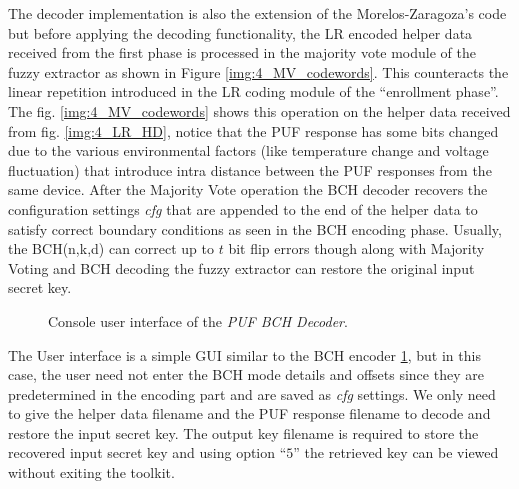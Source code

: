 	The decoder implementation is also the extension of the Morelos-Zaragoza's code \cite{69} but before applying the decoding functionality, the LR encoded helper data received from the first phase is processed in the majority vote module of the fuzzy extractor as shown in Figure \ref{img:4_MV_codewords}. This counteracts the linear repetition introduced in the LR coding module of the ``enrollment phase''. The fig. \ref{img:4_MV_codewords} shows this operation on the helper data received from fig. \ref{img:4_LR_HD}, notice that the PUF
	response has some bits changed due to the various environmental factors (like temperature change and voltage fluctuation) that introduce intra distance between the PUF responses from the same device. After the Majority Vote operation the BCH decoder recovers the configuration settings \emph{cfg} that are appended to the end of the helper data to satisfy correct boundary conditions as seen in the BCH encoding phase. Usually, the BCH(n,k,d) can correct up to $t$ bit flip errors though along with Majority
	Voting and BCH decoding the fuzzy extractor can restore the original input secret key.\\

	\begin{figure}
	\centering
	\caption{Console user interface of the \emph{PUF BCH Decoder}.}
	\label{img:BCH_decoder_GUI}
	\end{figure}
	The User interface is a simple GUI similar to the BCH encoder \ref{img:BCH_decoder_GUI}, but in this case, the user need not enter the BCH mode details and offsets since they are predetermined in the encoding part and are saved as \emph{cfg} settings. We only need to give the helper data filename and the PUF response filename to decode and restore the input secret key. The output key filename is required to store the recovered input secret key and using option ``$5$'' the retrieved key can be viewed without
	exiting the toolkit.\\


